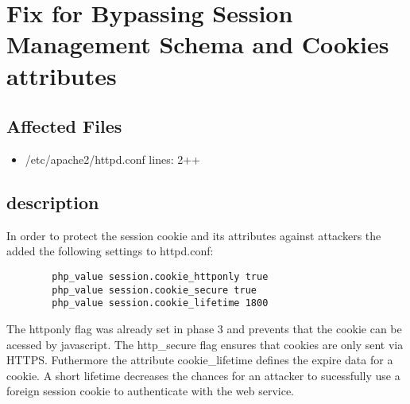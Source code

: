 \chapter{Fix for Bypassing Session Management Schema and Cookies attributes}
\section{Affected Files}

\begin{itemize}
\item /etc/apache2/httpd.conf lines: 2++
\end{itemize}

\section{description}
In order to protect the session cookie and its attributes against attackers the added the following settings to httpd.conf:

\begin{lstlisting}
	    php_value session.cookie_httponly true
	    php_value session.cookie_secure true
	    php_value session.cookie_lifetime 1800
\end{lstlisting}

The httponly flag was already set in phase 3 and prevents that the cookie can be acessed by javascript.
The http\_secure flag ensures that cookies are only sent via HTTPS. \newline
Futhermore the attribute cookie\_lifetime defines the expire data for a cookie. A short lifetime decreases the chances for an attacker to sucessfully use a foreign session cookie to authenticate with the web service.


